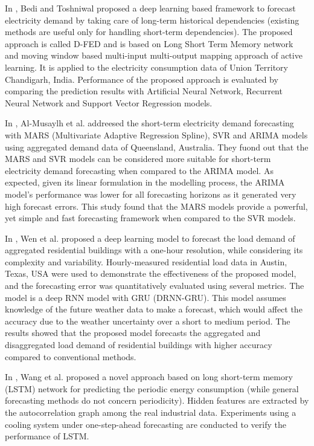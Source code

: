 In \cite{BEDI20191312}, Bedi and Toshniwal proposed a deep learning based framework to forecast electricity demand by taking care of long-term historical dependencies (existing methods are useful only for handling short-term dependencies).
The proposed approach is called D-FED and is based on Long Short Term Memory network and moving window based multi-input multi-output mapping approach of active learning.
It is applied to the electricity consumption data of Union Territory Chandigarh, India.
Performance of the proposed approach is evaluated by comparing the prediction results with Artificial Neural Network, Recurrent Neural Network and Support Vector Regression models.

In \cite{ALMUSAYLH20181}, Al-Musaylh et al. addreesed the short-term electricity demand forecasting with MARS (Multivariate Adaptive Regression Spline), SVR and ARIMA models using aggregated demand data of Queensland, Australia.
They fuond out that the MARS and SVR models can be considered more suitable for short-term electricity demand forecasting when compared to the ARIMA model.
As expected, given its linear formulation in the modelling process, the ARIMA model’s performance was lower for all forecasting horizons as it generated very high forecast errors.
This study found that the MARS models provide a powerful, yet simple and fast forecasting framework when compared to the SVR models.

In \cite{WEN2020106073}, Wen et al. proposed a deep learning model to forecast the load demand of aggregated residential buildings with a one-hour resolution, while considering its complexity and variability.
Hourly-measured residential load data in Austin, Texas, USA were used to demonstrate the effectiveness of the proposed model, and the forecasting error was quantitatively evaluated using several metrics.
The model is a deep RNN model with GRU (DRNN-GRU).
This model assumes knowledge of the future weather data to make a forecast, which would affect the accuracy due to the weather uncertainty over a short to medium period.
The results showed that the proposed model forecasts the aggregated and disaggregated load demand of residential buildings with higher accuracy compared to conventional methods.

In \cite{WANG2020117197}, Wang et al. proposed a novel approach based on long short-term memory (LSTM) network for predicting the periodic energy consumption (while general forecasting methods do not concern periodicity).
Hidden features are extracted by the autocorrelation graph among the real industrial data.
Experiments using a cooling system under one-step-ahead forecasting are conducted to verify the performance of LSTM.

